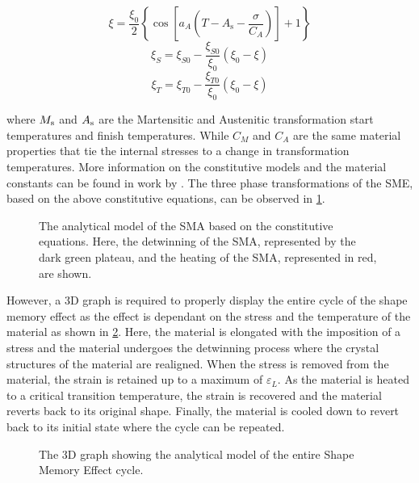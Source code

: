 \begin{equation}
  \label{eq:A_transf}
  \xi = \frac{\xi_0}{2}\left\{\cos\left[a_A\left(T-A_\mathrm{s}-\frac{\sigma}{C_A}\right)\right]+1\right\}
\end{equation}
\begin{equation}
    \label{eq:a-transf_1}
    \xi_S = \xi_{S0} - \frac{\xi_{S0}}{\xi_0}(\xi_0-\xi)
\end{equation}
\begin{equation}
    \label{eq:a-transf_2}
    \xi_T = \xi_{T0} - \frac{\xi_{T0}}{\xi_0}(\xi_0-\xi)
\end{equation}

where $M_\mathrm{s}$ and $A_\mathrm{s}$ are the Martensitic and Austenitic transformation start temperatures and finish temperatures. While $C_M$ and $C_A$ are the same material properties that tie the internal stresses to a change in transformation temperatures. More information on the constitutive models and the material constants can be found in work by \cite{brinsonOneDimensionalConstitutiveBehavior1993}. The three phase transformations of the SME, based on the above constitutive equations, can be observed in \cref{fig:brinson-model-stress-strain}.
\begin{figure}[hbt]
    \centering
    \resizebox{0.75\textwidth}{!}{}
    \caption{The analytical model of the SMA based on the \cite{brinsonOneDimensionalConstitutiveBehavior1993} constitutive equations. Here, the detwinning of the SMA, represented by the dark green plateau, and the heating of the SMA, represented in red, are shown.}
    \label{fig:brinson-model-stress-strain}
\end{figure}

However, a 3D graph is required to properly display the entire cycle of the shape memory effect as the effect is dependant on the stress and the temperature of the material as shown in \cref{fig:brinson-model-3d}. Here, the material is elongated with the imposition of a stress and the material undergoes the detwinning process where the crystal structures of the material are realigned. When the stress is removed from the material, the strain is retained up to a maximum of $\varepsilon_L$. As the material is heated to a critical transition temperature, the strain is recovered and the material reverts back to its original shape. Finally, the material is cooled down to revert back to its initial state where the cycle can be repeated.

\begin{figure}[hbt]
    \centering
    \resizebox{0.75\textwidth}{!}{}
    \caption{The 3D graph showing the \cite{brinsonOneDimensionalConstitutiveBehavior1993} analytical model of the entire Shape Memory Effect cycle.}
    \label{fig:brinson-model-3d}
\end{figure}

